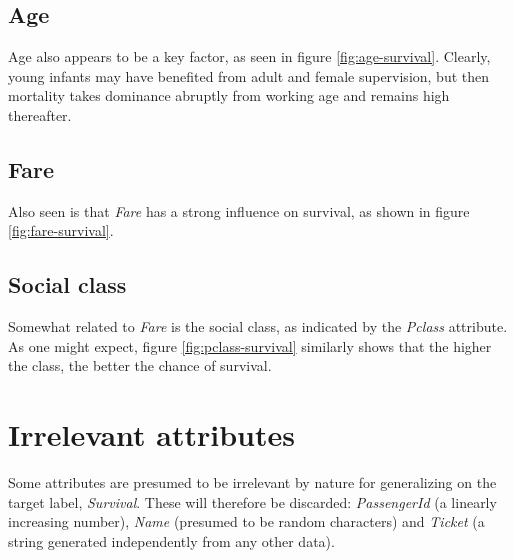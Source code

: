 \documentclass[11.5pt]{article}
\newcommand{\ti}[1] {\textit{#1}}
\newcommand{\fn}[1] {\footnote{#1}}
\newcommand\ifrac[2]{\nicefrac{#1}{#2}}
\def\i#1/#2{ \ifrac{#1}{#2}  }
\begin{document}
\subsection*{Age}

Age also appears to be a key factor, as seen in figure \ref{fig:age-survival}. Clearly, young infants may have benefited from adult and female  supervision, but then mortality takes dominance abruptly from working age and remains high thereafter.





\subsection*{Fare}

Also seen is that \ti{Fare} has a strong influence on survival, as shown in figure \ref{fig:fare-survival}.



\subsection*{Social class}

Somewhat related to \ti{Fare} is the social class, as indicated by the \ti{Pclass} attribute. As one might expect, figure \ref{fig:pclass-survival}  similarly shows that the higher the class, the better the chance of survival.



\section{Irrelevant attributes}

Some attributes are presumed to be irrelevant by nature for generalizing on the target label, \ti{Survival}. These will therefore be discarded: \ti{PassengerId} (a linearly increasing number),  \ti{Name} (presumed to be random characters) and \ti{Ticket} (a string generated independently from any other data). 
\end{document}
